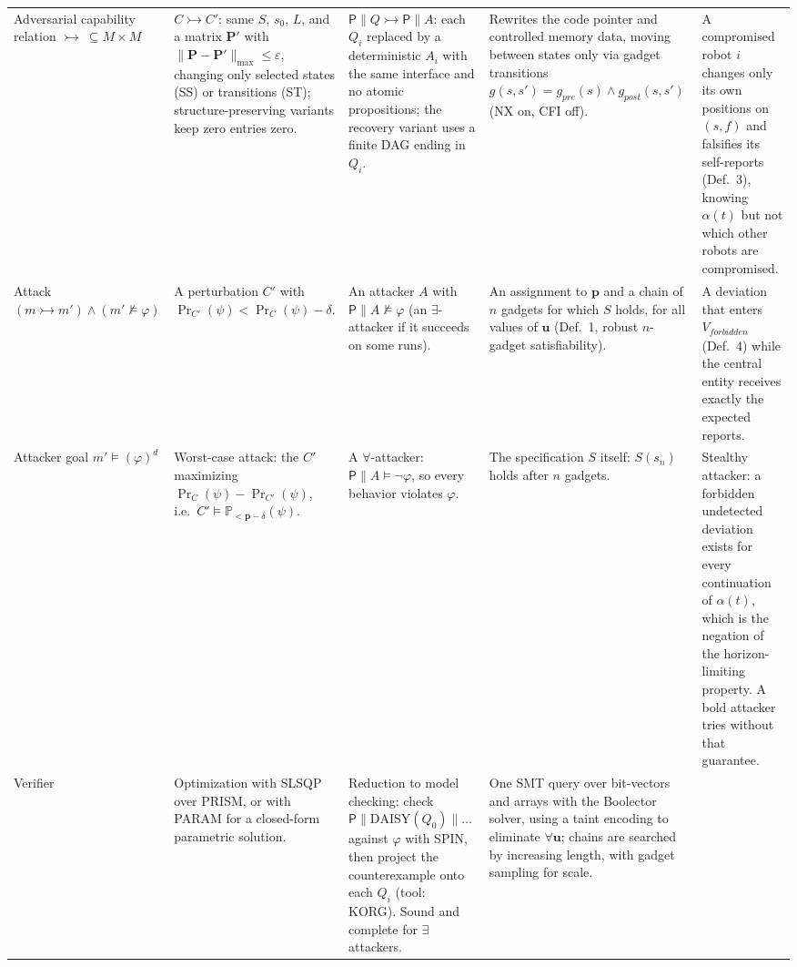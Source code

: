 \documentclass[11pt]{amsart}
\theoremstyle{definition}
\theoremstyle{remark}
\newcommand{\nsat}{\not\models}
\newcommand{\adv}{\rightarrowtail}   %
\begin{document}
\begin{landscape}
\begin{longtable}{L{3.0cm} L{4.6cm} L{4.6cm} L{4.6cm} L{4.6cm}}
\addlinespace
Adversarial capability relation $\adv\ \subseteq M \times M$ &
$C \adv C'$: same $S$, $s_0$, $L$, and a matrix $\mathbf{P}'$ with $\|\mathbf{P} - \mathbf{P}'\|_{\max} \leq \varepsilon$, changing only selected states (SS) or transitions (ST); structure-preserving variants keep zero entries zero. &
$\mathsf{P} \parallel Q \adv \mathsf{P} \parallel A$: each $Q_i$ replaced by a deterministic $A_i$ with the same interface and no atomic propositions; the recovery variant uses a finite DAG ending in $Q_i$. &
Rewrites the code pointer and controlled memory data, moving between states only via gadget transitions $g(s, s') = g_{\mathit{pre}}(s) \wedge g_{\mathit{post}}(s, s')$ (NX on, CFI off). &
A compromised robot $i$ changes only its own positions on $(s, f)$ and falsifies its self-reports (Def.~3), knowing $\alpha(t)$ but not which other robots are compromised. \\
\addlinespace
Attack $(m \adv m') \wedge (m' \nsat \varphi)$ &
A perturbation $C'$ with $\Pr_{C'}(\psi) < \Pr_C(\psi) - \delta$. &
An attacker $A$ with $\mathsf{P} \parallel A \nsat \varphi$ (an $\exists$-attacker if it succeeds on some runs). &
An assignment to $\mathbf{p}$ and a chain of $n$ gadgets for which $S$ holds, for all values of $\mathbf{u}$ (Def.~1, robust $n$-gadget satisfiability). &
A deviation that enters $V_{\mathit{forbidden}}$ (Def.~4) while the central entity receives exactly the expected reports. \\
\addlinespace
Attacker goal $m' \models (\varphi)^d$ &
Worst-case attack: the $C'$ maximizing $\Pr_C(\psi) - \Pr_{C'}(\psi)$, i.e.\ $C' \models \mathbb{P}_{< \mathbf{p} - \delta}(\psi)$. &
A $\forall$-attacker: $\mathsf{P} \parallel A \models \neg\varphi$, so every behavior violates $\varphi$. &
The specification $S$ itself: $S(s_n)$ holds after $n$ gadgets. &
Stealthy attacker: a forbidden undetected deviation exists for every continuation of $\alpha(t)$, which is the negation of the horizon-limiting property. A bold attacker tries without that guarantee. \\
\addlinespace
Verifier &
Optimization with SLSQP over PRISM, or with PARAM for a closed-form parametric solution. &
Reduction to model checking: check $\mathsf{P} \parallel \mathrm{DAISY}(Q_0) \parallel \dots$ against $\varphi$ with SPIN, then project the counterexample onto each $Q_i$ (tool: KORG). Sound and complete for $\exists$ attackers. &
One SMT query over bit-vectors and arrays with the Boolector solver, using a taint encoding to eliminate $\forall \mathbf{u}$; chains are searched by increasing length, with gadget sampling for scale. &

\end{longtable}
\end{landscape}
\end{document}
